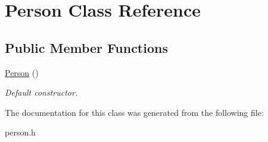 \hypertarget{class_person}{\section{Person Class Reference}
\label{class_person}
}
\subsection*{Public Member Functions}
\begin{DoxyCompactItemize}
\item 
\hypertarget{class_person_a0397c6f89fafc12e738923f612bc41a3}{\hyperlink{class_person_a0397c6f89fafc12e738923f612bc41a3}{Person} ()}\label{class_person_a0397c6f89fafc12e738923f612bc41a3}

\begin{DoxyCompactList}\small\item\em Default constructor. \end{DoxyCompactList}\end{DoxyCompactItemize}


The documentation for this class was generated from the following file\+:\begin{DoxyCompactItemize}
\item 
person.\+h\end{DoxyCompactItemize}
